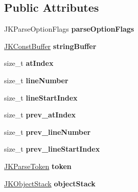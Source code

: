 \subsection*{Public Attributes}
\begin{DoxyCompactItemize}
\item 
\mbox{\label{structJKParseState_a1f3490e9a09b5b8a3e6da9acbf931dc6}} 
J\+K\+Parse\+Option\+Flags {\bfseries parse\+Option\+Flags}
\item 
\mbox{\label{structJKParseState_ac4058997292d1db6df9a98fdad4490c6}} 
\hyperlink{structJKConstBuffer}{J\+K\+Const\+Buffer} {\bfseries string\+Buffer}
\item 
\mbox{\label{structJKParseState_a76a9ba58b3d6d6cf0c4c14bbd4504c06}} 
size\+\_\+t {\bfseries at\+Index}
\item 
\mbox{\label{structJKParseState_ac3782de601b30a5b130bf0cdac9ad8da}} 
size\+\_\+t {\bfseries line\+Number}
\item 
\mbox{\label{structJKParseState_a20c602b9dcd7a8c97188f52a139f20cc}} 
size\+\_\+t {\bfseries line\+Start\+Index}
\item 
\mbox{\label{structJKParseState_aba55775f625aafeb9cd2e10283c7a9c2}} 
size\+\_\+t {\bfseries prev\+\_\+at\+Index}
\item 
\mbox{\label{structJKParseState_ae437d0653063a9138624c6583959317d}} 
size\+\_\+t {\bfseries prev\+\_\+line\+Number}
\item 
\mbox{\label{structJKParseState_aa7cb604a31c86b51cf1fb63eab1bbb3c}} 
size\+\_\+t {\bfseries prev\+\_\+line\+Start\+Index}
\item 
\mbox{\label{structJKParseState_a6f83002325505e9ed5e773ceb67dde61}} 
\hyperlink{structJKParseToken}{J\+K\+Parse\+Token} {\bfseries token}
\item 
\mbox{\label{structJKParseState_a7791f3bf2c8783211532137805d8d840}} 
\hyperlink{structJKObjectStack}{J\+K\+Object\+Stack} {\bfseries object\+Stack}

\end{DoxyCompactItemize}
